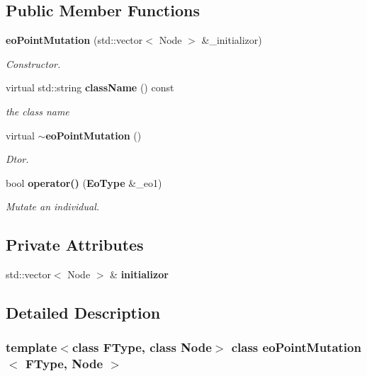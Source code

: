 \subsection*{Public Member Functions}
\begin{CompactItemize}
\item 
{\bf eo\-Point\-Mutation} (std::vector$<$ Node $>$ \&\_\-initializor)
\begin{CompactList}\small\item\em Constructor. \item\end{CompactList}\item 
virtual std::string {\bf class\-Name} () const \label{classeo_point_mutation_a1}

\begin{CompactList}\small\item\em the class name \item\end{CompactList}\item 
virtual {\bf $\sim$eo\-Point\-Mutation} ()\label{classeo_point_mutation_a2}

\begin{CompactList}\small\item\em Dtor. \item\end{CompactList}\item 
bool {\bf operator()} ({\bf Eo\-Type} \&\_\-eo1)
\begin{CompactList}\small\item\em Mutate an individual. \item\end{CompactList}\end{CompactItemize}
\subsection*{Private Attributes}
\begin{CompactItemize}
\item 
std::vector$<$ Node $>$ \& {\bf initializor}\label{classeo_point_mutation_r0}

\end{CompactItemize}


\subsection{Detailed Description}
\subsubsection*{template$<$class FType, class Node$>$ class eo\-Point\-Mutation$<$ FType, Node $>$}

